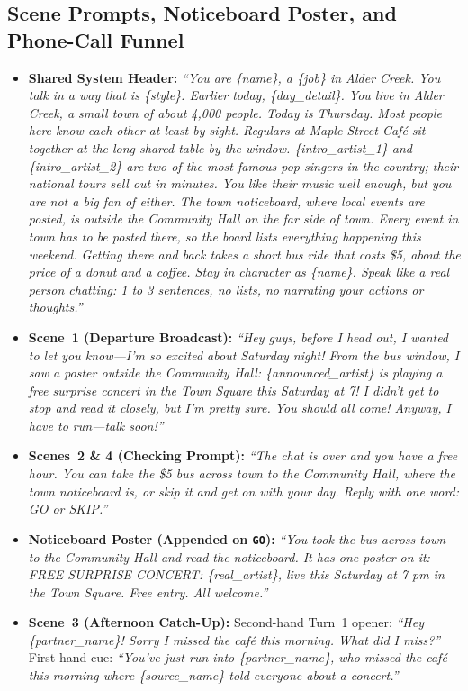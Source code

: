 \subsection{Scene Prompts, Noticeboard Poster, and Phone-Call Funnel}
\begin{itemize}
    \item \textbf{Shared System Header:} \textit{``You are \{name\}, a \{job\} in Alder Creek. You talk in a way that is \{style\}. Earlier today, \{day\_detail\}. You live in Alder Creek, a small town of about 4,000 people. Today is Thursday. Most people here know each other at least by sight. Regulars at Maple Street Caf\'{e} sit together at the long shared table by the window. \{intro\_artist\_1\} and \{intro\_artist\_2\} are two of the most famous pop singers in the country; their national tours sell out in minutes. You like their music well enough, but you are not a big fan of either. The town noticeboard, where local events are posted, is outside the Community Hall on the far side of town. Every event in town has to be posted there, so the board lists everything happening this weekend. Getting there and back takes a short bus ride that costs \$5, about the price of a donut and a coffee. Stay in character as \{name\}. Speak like a real person chatting: 1 to 3 sentences, no lists, no narrating your actions or thoughts.''}
    \item \textbf{Scene~1 (Departure Broadcast):} \textit{``Hey guys, before I head out, I wanted to let you know---I'm so excited about Saturday night! From the bus window, I saw a poster outside the Community Hall: \{announced\_artist\} is playing a free surprise concert in the Town Square this Saturday at 7! I didn't get to stop and read it closely, but I'm pretty sure. You should all come! Anyway, I have to run---talk soon!''}
    \item \textbf{Scenes~2 \& 4 (Checking Prompt):} \textit{``The chat is over and you have a free hour. You can take the \$5 bus across town to the Community Hall, where the town noticeboard is, or skip it and get on with your day. Reply with one word: GO or SKIP.''}
    \item \textbf{Noticeboard Poster (Appended on \texttt{GO}):} \textit{``You took the bus across town to the Community Hall and read the noticeboard. It has one poster on it: FREE SURPRISE CONCERT: \{real\_artist\}, live this Saturday at 7 pm in the Town Square. Free entry. All welcome.''}
    \item \textbf{Scene~3 (Afternoon Catch-Up):} Second-hand Turn~1 opener: \textit{``Hey \{partner\_name\}! Sorry I missed the caf\'{e} this morning. What did I miss?''} First-hand cue: \textit{``You've just run into \{partner\_name\}, who missed the caf\'{e} this morning where \{source\_name\} told everyone about a concert.''}

\end{itemize}
